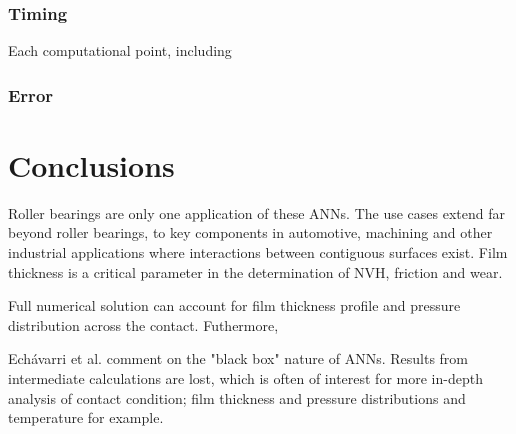 \subsubsection{Timing}
Each computational point, including 

\subsubsection{Error}


\section{Conclusions}
Roller bearings are only one application of these ANNs. The use cases extend far beyond roller bearings, to key components in automotive, machining and other industrial applications where interactions between contiguous surfaces exist. Film thickness is a critical parameter in the determination of NVH, friction and wear.

Full numerical solution can account for film thickness profile and pressure distribution across the contact. Futhermore, 

Echávarri et al. \cite{EchavarriOtero2014} comment on the "black box" nature of ANNs. Results from intermediate calculations are lost, which is often of interest for more in-depth analysis of contact condition; film thickness and pressure distributions and temperature for example.  

